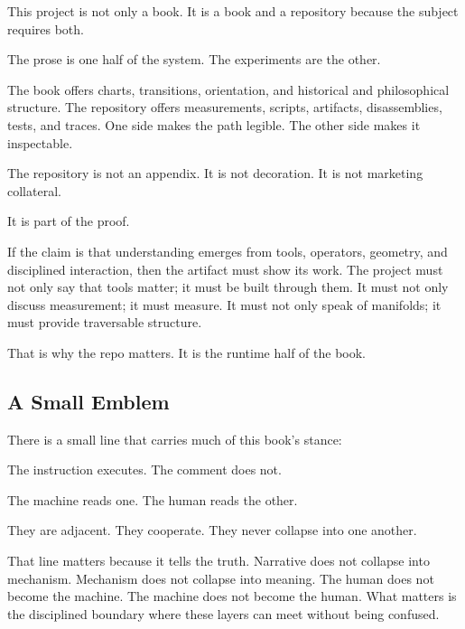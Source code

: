 This project is not only a book. It is a book and a repository because
the subject requires both.

The prose is one half of the system. The experiments are the other.

The book offers charts, transitions, orientation, and historical and
philosophical structure. The repository offers measurements, scripts,
artifacts, disassemblies, tests, and traces. One side makes the path
legible. The other side makes it inspectable.

The repository is not an appendix. It is not decoration. It is not
marketing collateral.

It is part of the proof.

If the claim is that understanding emerges from tools, operators,
geometry, and disciplined interaction, then the artifact must show its
work. The project must not only say that tools matter; it must be built
through them. It must not only discuss measurement; it must measure. It
must not only speak of manifolds; it must provide traversable structure.

That is why the repo matters. It is the runtime half of the book.

\hypertarget{a-small-emblem}{%
\subsection{A Small Emblem}\label{a-small-emblem}}

There is a small line that carries much of this book's stance:

\begin{Shaded}
\begin{Highlighting}[]
 
\end{Highlighting}
\end{Shaded}

The instruction executes. The comment does not.

The machine reads one. The human reads the other.

They are adjacent. They cooperate. They never collapse into one another.

That line matters because it tells the truth. Narrative does not
collapse into mechanism. Mechanism does not collapse into meaning. The
human does not become the machine. The machine does not become the
human. What matters is the disciplined boundary where these layers can
meet without being confused.

